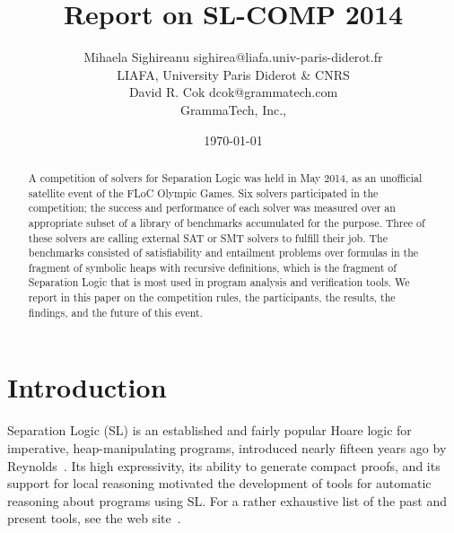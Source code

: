 \documentclass[twoside,11pt]{article}
\title{Report on SL-COMP 2014}
\author{\name Mihaela Sighireanu \email sighirea@liafa.univ-paris-diderot.fr \\
        \addr LIAFA, University Paris Diderot \& CNRS \\
        \AND
        \name David R. Cok \email dcok@grammatech.com \\
        \addr GrammaTech, Inc., }
\date{\today}
\begin{document}
\sloppy
\maketitle


\begin{abstract}
A competition of solvers for Separation Logic 
was held in May 2014, 
as an unofficial satellite event of the FLoC Olympic Games.
Six solvers participated in the competition; the success and performance
of each solver was measured over an appropriate subset of a library of benchmarks
accumulated for the purpose.
Three of these solvers are calling external SAT or SMT solvers to fulfill  their job.
The benchmarks consisted of satisfiability and entailment problems
over formulas in the fragment of symbolic heaps with recursive definitions, 
which is the fragment of Separation Logic that is most used in program analysis and verification tools.
We report in this paper on 
the competition rules, the participants, the results, the findings, and  
the future of this event.
\end{abstract}






\section{Introduction}

Separation Logic (SL) is an established and fairly popular Hoare logic 
for imperative, heap-manipulating programs, 
introduced nearly fifteen years ago by Reynolds~\cite{Reynolds99,OHearnRY01,Reynolds02}. 
%
Its high expressivity, its ability to generate compact proofs, and 
its support for local reasoning 
motivated the development of tools for automatic reasoning about programs using SL.
For a rather exhaustive list of the past and present tools, see the web site~\cite{OHearn-SLsite}.
\end{document}
